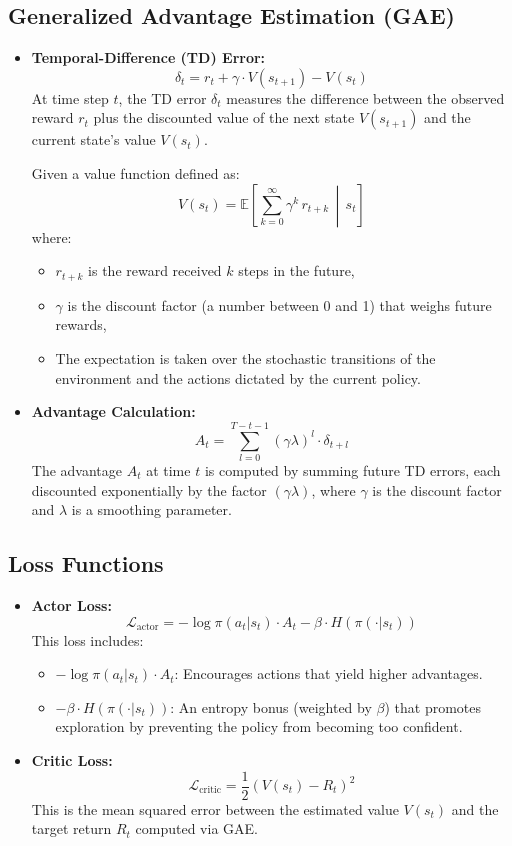 \documentclass{article}
\begin{document}
\subsection{Generalized Advantage Estimation (GAE)}
\begin{itemize}
    \item \textbf{Temporal-Difference (TD) Error:}
    \[
    \delta_t = r_t + \gamma \cdot V(s_{t+1}) - V(s_t)
    \]
    At time step \( t \), the TD error \( \delta_t \) measures the difference between the observed reward \( r_t \) plus the discounted value of the next state \( V(s_{t+1}) \) and the current state's value \( V(s_t) \).
    
	Given a value function defined as:
	\[
	V(s_t) = \mathbb{E}\left[\sum_{k=0}^{\infty} \gamma^k \, r_{t+k} \,\middle|\, s_t\right]
	\]
	where:
	\begin{itemize}
	    \item \(r_{t+k}\) is the reward received \(k\) steps in the future,
	    \item \(\gamma\) is the discount factor (a number between 0 and 1) that weighs future rewards,
	    \item The expectation is taken over the stochastic transitions of the environment and the actions dictated by the current policy.
	\end{itemize}

    \item \textbf{Advantage Calculation:}
    \[
    A_t = \sum_{l=0}^{T-t-1} (\gamma \lambda)^l \cdot \delta_{t+l}
    \]
    The advantage \( A_t \) at time \( t \) is computed by summing future TD errors, each discounted exponentially by the factor \( (\gamma \lambda) \), where \( \gamma \) is the discount factor and \( \lambda \) is a smoothing parameter.
\end{itemize}

\subsection{Loss Functions}
\begin{itemize}
    \item \textbf{Actor Loss:}
    \[
    \mathcal{L}_{\text{actor}} = -\log \pi(a_t|s_t) \cdot A_t - \beta \cdot H(\pi(\cdot|s_t))
    \]
    This loss includes:
    \begin{itemize}
        \item \( -\log \pi(a_t|s_t) \cdot A_t \): Encourages actions that yield higher advantages.
        \item \( -\beta \cdot H(\pi(\cdot|s_t)) \): An entropy bonus (weighted by \( \beta \)) that promotes exploration by preventing the policy from becoming too confident.
    \end{itemize}
    
    \item \textbf{Critic Loss:}
    \[
    \mathcal{L}_{\text{critic}} = \frac{1}{2} \left( V(s_t) - R_t \right)^2
    \]
    This is the mean squared error between the estimated value \( V(s_t) \) and the target return \( R_t \) computed via GAE.
\end{itemize}
\end{document}

